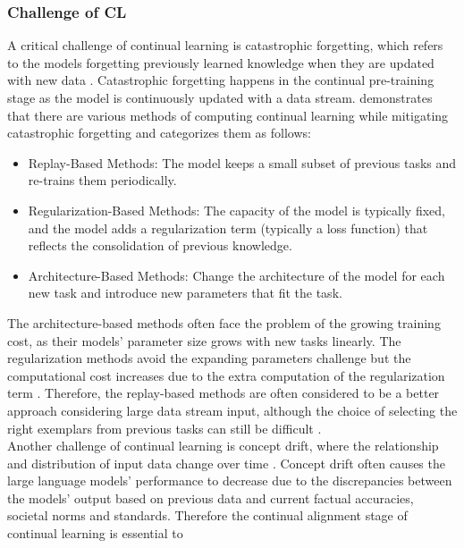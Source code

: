 \documentclass[runningheads]{llncs}
\begin{document}
\subsubsection{Challenge of CL}
\noindent \newline
A critical challenge of continual learning is catastrophic forgetting, which refers to the models forgetting previously learned knowledge 
when they are updated with new data \cite{Gupta23}. Catastrophic forgetting happens in the continual pre-training stage as the model is continuously updated with a data stream.
\cite{Shi24} demonstrates that there are various methods of computing continual learning while mitigating
catastrophic forgetting \cite{Gupta23} and categorizes them as follows:
\begin{itemize}
  \item Replay-Based Methods: The model keeps a small subset of previous tasks and re-trains them periodically.
  \item Regularization-Based Methods: The capacity of the model is typically fixed, and the model adds a regularization term (typically a loss function)
that reflects the consolidation of previous knowledge.
  \item Architecture-Based Methods: Change the architecture of the model for each new task and introduce new parameters that fit the task.
\end{itemize}
\noindent \newline
The architecture-based methods often face the problem of the growing 
training cost, as their models' parameter size grows with new tasks linearly\cite{Jovanov}. The regularization methods avoid the expanding parameters challenge but the computational cost
increases due to the extra computation of the regularization term \cite{Wang24}. Therefore, the replay-based methods are often considered to be
a better approach considering large data stream input, although the choice of selecting the right exemplars from previous tasks can still be difficult \cite{Jovanov}. \\
\noindent \newline
Another challenge of continual learning is concept drift, where the relationship and distribution of input data change over time \cite{Biesi20}. Concept drift often causes the large language models' performance to decrease
due to the discrepancies between the models' output based on previous data and current factual accuracies, societal norms and standards. Therefore the continual alignment stage of continual learning is essential to 
\end{document}
